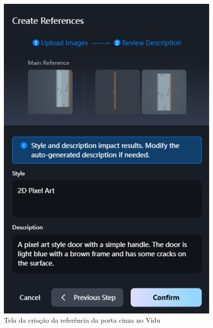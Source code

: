 \begin{figure}[htbp]
    \centering
    \caption{\small Tela da criação da referência da porta cinza no Vidu}
    \label{fig:viduReferenciaPortaC}
    \includegraphics[width=0.4\linewidth]{figs/vidu/tela_referencia_porta_tutorial.PNG}
\end{figure}

